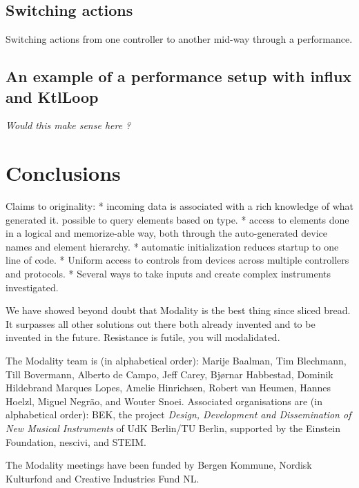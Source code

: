 \documentclass{article}
\begin{document}
\subsection{Switching actions}
\label{sub:switching_actions}

Switching actions from one controller to another mid-way through a performance.

\subsection{An example of a performance setup with influx and KtlLoop}

\emph{Would this make sense here ?}

\section{Conclusions}
\label{sec:conclusions}



Claims to originality:
* incoming data is associated with a rich knowledge of what generated it. possible to query elements based on type.
* access to elements done in a logical and memorize-able way, both through the auto-generated device names and element hierarchy.
* automatic initialization reduces startup to one line of code.
* Uniform access to controls from devices across multiple controllers and protocols.
* Several ways to take inputs and create complex instruments investigated.

We have showed beyond doubt that Modality is the best thing since sliced bread. It surpasses all other solutions out there both already invented and to be invented in the future. Resistance is futile, you will modalidated.


\begin{acknowledgments}
The Modality team is (in alphabetical order):
    Marije Baalman,
    Tim Blechmann,
    Till Bovermann,
    Alberto de Campo,
    Jeff Carey,
    Bj\o{}rnar Habbestad,
    Dominik Hildebrand Marques Lopes,
    Amelie Hinrichsen,
    Robert van Heumen,
    Hannes Hoelzl,
    Miguel Negr\~{a}o, and
    Wouter Snoei.
Associated organisations are (in alphabetical order):
BEK,
the project \emph{Design, Development and Dissemination of New Musical Instruments} of UdK Berlin/TU Berlin, supported by the Einstein Foundation,
nescivi, and
STEIM.

The Modality meetings have been funded by Bergen Kommune, Nordisk Kulturfond and Creative Industries Fund NL.


\end{acknowledgments} 


\end{document}

